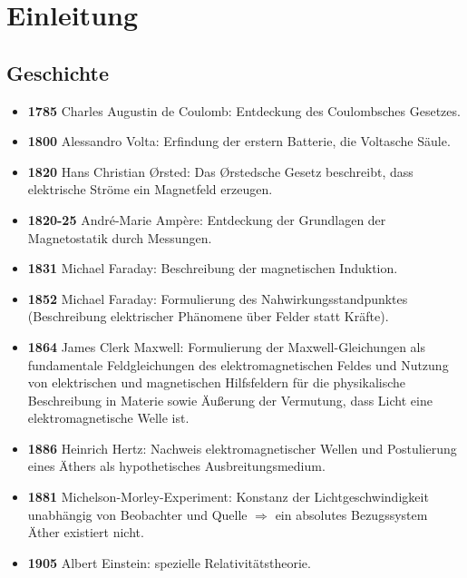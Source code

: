 
\chapter{Einleitung\label{einleitung}}

\section{Geschichte}

\begin{itemize}
	\item \textbf{1785} \textendash{} Charles Augustin de Coulomb: Entdeckung des Coulombsches Gesetzes.

	\item \textbf{1800} \textendash{} Alessandro Volta: Erfindung der erstern Batterie, die Voltasche Säule.

	\item \textbf{1820} \textendash{}  Hans Christian \O{}rsted: Das \O{}rstedsche Gesetz beschreibt, dass elektrische Ströme ein Magnetfeld erzeugen.

	\item \textbf{1820-25} \textendash{}   André-Marie Ampère: Entdeckung der Grundlagen der Magnetostatik durch Messungen.

	\item \textbf{1831} \textendash{}  Michael Faraday: Beschreibung der magnetischen Induktion.

	\item \textbf{1852} \textendash{}  Michael Faraday: Formulierung des Nahwirkungsstandpunktes (Beschreibung elektrischer Phänomene über Felder statt Kräfte).

	\item \textbf{1864} \textendash{} James Clerk Maxwell: Formulierung der Maxwell-Gleichungen als fundamentale Feldgleichungen des elektromagnetischen Feldes und Nutzung von elektrischen und magnetischen Hilfsfeldern für die physikalische Beschreibung in Materie sowie Äußerung der Vermutung, dass Licht eine elektromagnetische Welle ist.

	\item \textbf{1886} \textendash{} Heinrich Hertz: Nachweis elektromagnetischer Wellen und Postulierung eines Äthers als hypothetisches Ausbreitungsmedium.

	\item \textbf{1881} \textendash{} Michelson-Morley-Experiment: Konstanz der Lichtgeschwindigkeit unabhängig von Beobachter und Quelle ${\Rightarrow}$ ein absolutes Bezugssystem Äther existiert nicht.

	\item \textbf{1905} \textendash{} Albert Einstein: spezielle Relativitätstheorie.

\end{itemize}





